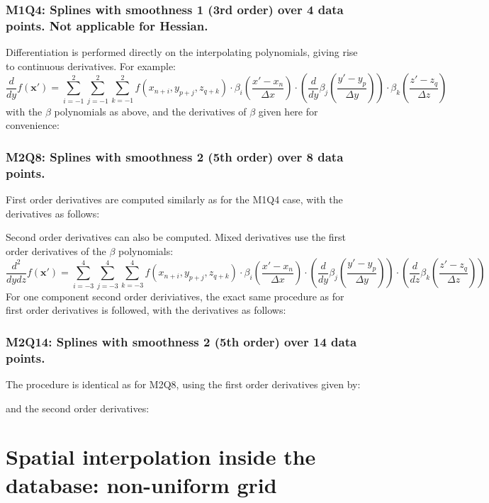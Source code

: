 \documentclass[11pt]{article}
\begin{document}
\subsubsection*{M1Q4: Splines with smoothness 1 (3rd order) over 4 data points. Not applicable for Hessian.}
\label{sec:M1Q4 diff}
Differentiation is performed directly on the interpolating polynomials, giving rise to continuous derivatives.
For example:
\begin{equation}
    \frac{d}{dy} f(\mathbf{x}') =
    \sum_{i=-1}^2 \sum_{j=-1}^2 \sum_{k=-1}^2
    f(x_{n+i}, y_{p+j}, z_{q+k})
    \cdot \beta_i\left(\frac{x' - x_n}{\Delta x}\right)
    \cdot \left(\frac{d}{dy} \beta_j\left(\frac{y' - y_p}{\Delta y}\right)\right)
    \cdot \beta_k\left(\frac{z' - z_q}{\Delta z}\right)
\end{equation}
with the $\beta$ polynomials as above, and the derivatives of $\beta$ given here for convenience:

\subsubsection*{M2Q8: Splines with smoothness 2 (5th order) over 8 data points.}
\label{sec:M2Q8 diff}
First order derivatives are computed similarly as for the M1Q4 case, with the derivatives as follows:

Second order derivatives can also be computed.
Mixed derivatives use the first order derivatives of the $\beta$ polynomials:
\begin{equation}
    \frac{d^2}{dydz} f(\mathbf{x}') =
    \sum_{i=-3}^4 \sum_{j=-3}^4 \sum_{k=-3}^4
    f(x_{n+i}, y_{p+j}, z_{q+k})
    \cdot \beta_i\left(\frac{x' - x_n}{\Delta x}\right)
    \cdot \left(\frac{d}{dy} \beta_j\left(\frac{y' - y_p}{\Delta y}\right)\right)
    \cdot \left(\frac{d}{dz} \beta_k\left(\frac{z' - z_q}{\Delta z}\right)\right)
\end{equation}
For one component second order deriviatives, the exact same procedure as for first order derivatives is
followed, with the derivatives as follows:

\subsubsection*{M2Q14: Splines with smoothness 2 (5th order) over 14 data points.}
\label{sec:M2Q14 diff}
The procedure is identical as for M2Q8, using the first order derivatives given by:

and the second order derivatives:


\section{Spatial interpolation inside the database: non-uniform grid}\label{sec:interp}
\end{document}
